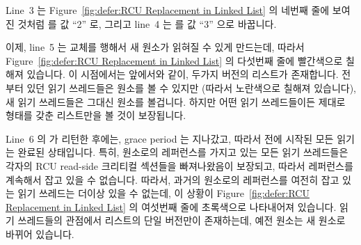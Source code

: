 Line~3 는
Figure~\ref{fig:defer:RCU Replacement in Linked List} 의 네번째 줄에 보여진
것처럼  를 값 ``2'' 로, 그리고 line~4 는  를 값 ``3'' 으로
바꿉니다.

이제, line~5 는 교체를 행해서 새 원소가 읽혀질 수 있게
만드는데, 따라서
Figure~\ref{fig:defer:RCU Replacement in Linked List} 의 다섯번째 줄에
빨간색으로 칠해져 있습니다.
이 시점에서는 앞에서와 같이, 두가지 버전의 리스트가 존재합니다.
전부터 있던 읽기 쓰레드들은  원소를 볼 수 있지만 (따라서
노란색으로 칠해져 있습니다), 새 읽기 쓰레드들은 그대신  원소를
볼겁니다.
하지만 어떤 읽기 쓰레드들이든 제대로 형태를 갖춘 리스트만을 볼 것이 보장됩니다.

Line~6 의  가 리턴한 후에는, grace period 는 지나갔고,
따라서  전에 시작된 모든 읽기는 완료된 상태입니다.
특히,  원소로의 레퍼런스를 가지고 있는 모든 읽기 쓰레드들은 각자의
RCU read-side 크리티컬 섹션들을 빠져나왔음이 보장되고, 따라서 레퍼런스를
계속해서 잡고 있을 수 없습니다.
따라서, 과거의 원소로의 레퍼런스를 여전히 잡고 있는 읽기 쓰레드는 더이상 있을
수 없는데, 이 상황이
Figure~\ref{fig:defer:RCU Replacement in Linked List} 의 여섯번째 줄에
초록색으로 나타내어져 있습니다.
읽기 쓰레드들의 관점에서 리스트의 단일 버전만이 존재하는데, 예전 원소는 새
원소로 바뀌어 있습니다.

